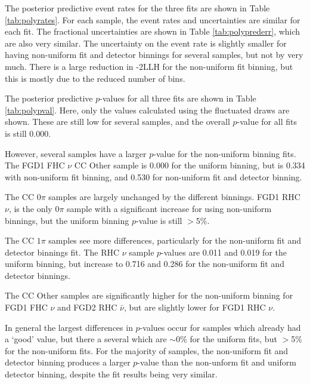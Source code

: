 The posterior predictive event rates for the three fits are shown in Table \ref{tab:polyrates}. For each sample, the event rates and uncertainties are similar for each fit. The fractional uncertainties are shown in Table \ref{tab:polyprederr}, which are also very similar. The uncertainty on the event rate is slightly smaller for having non-uniform fit and detector binnings for several samples, but not by very much. There is a large reduction in -2LLH for the non-uniform fit binning, but this is mostly due to the reduced number of bins.

The posterior predictive $p$-values for all three fits are shown in Table \ref{tab:polypval}. Here, only the values calculated using the fluctuated draws are shown. These are still low for several samples, and the overall $p$-value for all fits is still 0.000. 

However, several samples have a larger $p$-value for the non-uniform binning fits. The FGD1 FHC $\nu$ CC Other sample is 0.000 for the uniform binning, but is 0.334 with non-uniform fit binning, and 0.530 for non-uniform fit and detector binning. 

The CC $0\pi$ samples are largely unchanged by the different binnings. FGD1 RHC $\nu$, is the only 0$\pi$ sample with a significant increase for using non-uniform binnings, but the uniform binning $p$-value is still $>$5$\%$.

The CC $1\pi$ samples see more differences, particularly for the non-uniform fit and detector binnings fit. The RHC $\nu$ sample $p$-values are 0.011 and 0.019 for the uniform binning, but increase to 0.716 and 0.286 for the non-uniform fit and detector binnings. 

The CC Other samples are significantly higher for the non-uniform binning for FGD1 FHC $\nu$ and FGD2 RHC $\bar{\nu}$, but are slightly lower for FGD1 RHC $\nu$. 

In general the largest differences in $p$-values occur for samples which already had a `good' value, but there a several which are $\sim$0$\%$ for the uniform fits, but $>$5$\%$ for the non-uniform fits. For the majority of samples, the non-uniform fit and detector binning produces a larger $p$-value than the non-unform fit and uniform detector binning, despite the fit results being very similar.

